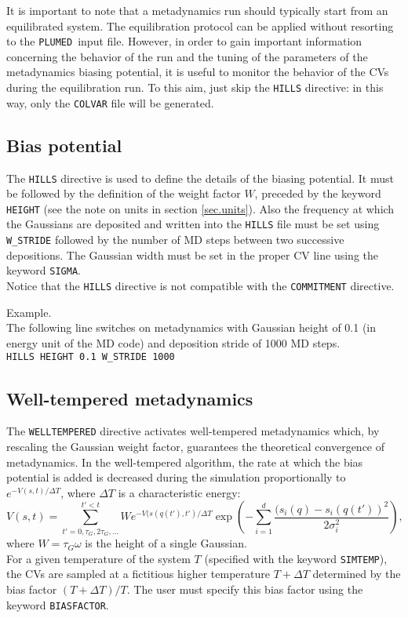 \documentclass[12pt,fleqn]{report}
\newcommand{\keyword}[1]{\index{Keywords!{\tt #1}} {\tt #1}}
\newcommand{\plumed}{{\tt PLUMED}}
\newcommand{\esempio}[1]{
\vspace{10pt}
\begin{flushright}
\colorbox{light-gray}{
   \begin{minipage}{13cm}
       \scriptsize{
{\fontfamily{phv} \fontseries{b}
 \selectfont Example. \\
 \fontseries{m} \selectfont #1 } }
\end{minipage}}
\end{flushright}
\vspace{20pt}
}
\begin{document}
It is important to note that a  metadynamics run should typically start from an
equilibrated system.  The equilibration protocol can be applied without
resorting to  the \plumed \ input file. However, in order to gain important
information concerning the behavior of the run and the tuning of the parameters
of the metadynamics biasing potential, it is useful to monitor the behavior of
the CVs during the equilibration run.
To this aim, just skip the \keyword{HILLS} directive:
in this way, only the {\tt COLVAR} file will be generated.

\subsection{Bias potential}
\label{ssc.bias}
The \keyword{HILLS} directive is used to define the details of the biasing
potential. It must be followed by the definition of the weight
factor $W$, preceded by the keyword {\tt HEIGHT} (see the note on
units in section \ref{sec.units}). Also the frequency at which the Gaussians
are deposited and written into the {\tt HILLS} file must be set using
{\tt  W\_STRIDE} followed by the number of MD steps between two successive depositions.  
The Gaussian width must be set in the proper CV line using the
keyword  {\tt SIGMA}.
\\
Notice that the {\tt HILLS} directive is not compatible with the {\tt COMMITMENT} directive.
\esempio{The following line switches on metadynamics with Gaussian height of 0.1 (in energy unit of the MD code)
and deposition stride of 1000 MD steps. \vspace{10pt} \\ 
{ \tt HILLS HEIGHT 0.1 W\_STRIDE 1000 } 
}

\subsection{Well-tempered metadynamics}
The {\tt WELLTEMPERED} directive activates well-tempered metadynamics \cite{Barducci:2008} which, 
by rescaling the Gaussian weight factor, guarantees the theoretical convergence of metadynamics.
In the well-tempered algorithm, the rate at which the bias potential is added is decreased
during the simulation proportionally to $e^{-V({s},t)/\Delta T}$,
where $\Delta T$ is a characteristic energy:
\begin{equation}
V({s},t)= \sum_{t'=0,\tau_G,2\tau_G,\dots}^{t'<t} W e^{-V({s}({q}(t'),t')/\Delta T} \exp\left(
-\sum_{i=1}^{d} \frac{(s_i({q})-s_i({q}(t'))^2}{2\sigma_i^2}
\right),
\label{meta_eq}
\end{equation}
where $W=\tau_G \omega$ is the height of a single Gaussian.
\\
For a given temperature of the system $T$ (specified with the  keyword {\tt SIMTEMP}), the
CVs are sampled at a fictitious higher temperature $T+\Delta T$ determined by the bias factor $(T+\Delta T)/T$. The user must specify this bias factor using the keyword {\tt BIASFACTOR}.
\end{document}
